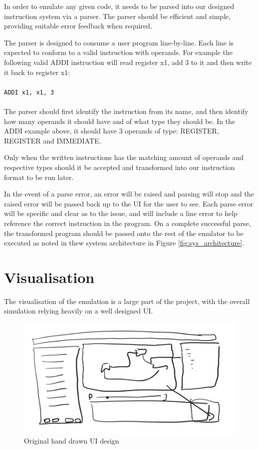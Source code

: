 In order to emulate any given code, it needs to be parsed into our designed instruction system via a parser. The parser should be efficient and simple, providing suitable error feedback when required.

The parser is designed to consume a user program line-by-line. Each line is expected to conform to a valid instruction with operands. For example the following valid ADDI instruction will read register x1, add 3 to it and then write it back to register x1:\\\\
\verb|ADDI x1, x1, 3|
\\\\
The parser should first identify the instruction from its name, and then identify how many operands it should have and of what type they should be. In the ADDI example above, it should have 3 operands of type: REGISTER, REGISTER and IMMEDIATE. 

Only when the written instructions has the matching amount of operands and respective types should it be accepted and transformed into our instruction format to be run later.

In the event of a parse error, an error will be raised and parsing will stop and the raised error will be passed back up to the UI for the user to see. Each parse error will be specific and clear as to the issue, and will include a line error to help reference the correct instruction in the program. On a complete successful parse, the transformed program should be passed onto the rest of the emulator to be executed as noted in thew system architecture in Figure \ref{fig:sys_architecture}.

\section{Visualisation}
The visualisation of the emulation is a large part of the project, with the overall simulation relying heavily on a well designed UI.

\begin{figure}[H]
    \centering
    \includegraphics[width=\linewidth]{dissertation/DATA/early_design.jpg}
    \caption{Original hand drawn UI design}
    \label{fig:early_ui_design}
\end{figure}

